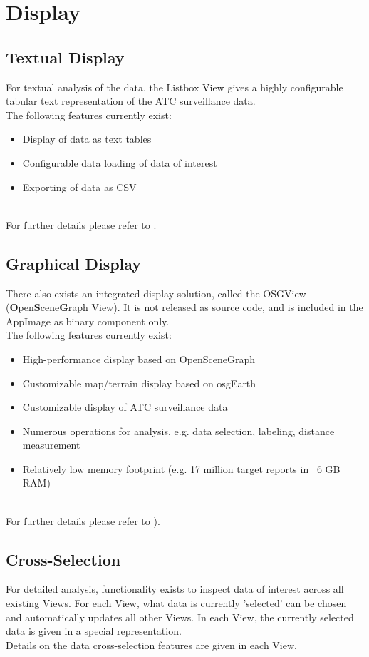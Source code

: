 \section{Display}

\subsection{Textual Display}

For textual analysis of the data, the Listbox View gives a highly configurable tabular text representation of the ATC surveillance data. \\

The following features currently exist:

\begin{itemize}  
\item Display of data as text tables
\item Configurable data loading of data of interest
\item Exporting of data as CSV
\end{itemize} 
\ \\

For further details please refer to .

\subsection{Graphical Display}
There also exists an integrated display solution, called the OSGView (\textbf{O}pen\textbf{S}cene\textbf{G}raph View). It is not released as source code, and is included in the AppImage as binary component only. \\

The following features currently exist:

\begin{itemize}  
\item High-performance display based on OpenSceneGraph
\item Customizable map/terrain display based on osgEarth
\item Customizable display of ATC surveillance data
\item Numerous operations for analysis, e.g. data selection, labeling, distance measurement
\item Relatively low memory footprint (e.g. 17 million target reports in ~6 GB RAM)
\end{itemize} 
\ \\

For further details please refer to ).

\subsection{Cross-Selection}

For detailed analysis, functionality exists to inspect data of interest across all existing Views. For each View, what data is currently 'selected' can be chosen and automatically updates all other Views. In each View, the currently selected data is given in a special representation. \\

Details on the data cross-selection features are given in each View.
